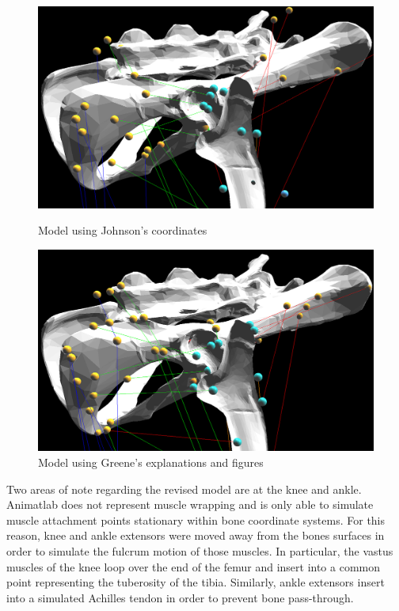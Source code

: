 \documentclass[runningheads,a4paper]{llncs}
\begin{document}
			\begin{figure}
				\centering
				\begin{minipage}{0.5\textwidth}
					\centering
					\includegraphics[width=\textwidth]{pel1.PNG}
					\caption{Model using Johnson's coordinates}
				\end{minipage}\hfill
				\begin{minipage}{0.5\textwidth}
					\centering
					\includegraphics[width=\textwidth]{pel2.PNG}
					\caption{Model using Greene's explanations and figures}
				\end{minipage}
			\end{figure}
	Two areas of note regarding the revised model are at the knee and ankle. Animatlab does not represent muscle wrapping and is only able to simulate muscle attachment points stationary within bone coordinate systems. For this reason, knee and ankle extensors were moved away from the bones surfaces in order to simulate the fulcrum motion of those muscles. In particular, the vastus muscles of the knee loop over the end of the femur and insert into a common point representing the tuberosity of the tibia. Similarly, ankle extensors insert into a simulated Achilles tendon in order to prevent bone pass-through. \par
\end{document}
